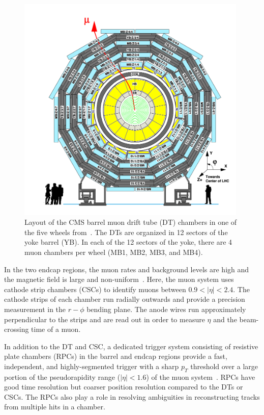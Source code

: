 \begin{figure}[ht]
    \centering
    \includegraphics[width=11cm]{figures/ch-2-cern-cms/phase-1-muon-barrel-DT-schematic.png}
    \caption[Layout of the CMS barrel muon drift tube (DT) chambers in one of the five wheels.]{Layout of the CMS barrel muon drift tube (DT) chambers in one of the five wheels from~\cite{CMS-2008-JINST-3-S08004}. The DTs are organized in 12 sectors of the yoke barrel (YB). In each of the 12 sectors of the yoke, there are 4 muon chambers per wheel (MB1, MB2, MB3, and MB4).}
    \label{fig:phase-1-muon-barrel-DT-schematic}
\end{figure}

In the two endcap regions, the muon rates and background levels are high and the magnetic field is large and non-uniform~\cite{CMS-2008-JINST-3-S08004}. Here, the muon system uses cathode strip chambers (CSCs) to identify muons between $0.9 < |\eta| < 2.4$. The cathode strips of each chamber run radially outwards and provide a precision measurement in the $r-\phi$ bending plane. The anode wires run approximately perpendicular to the strips and are read out in order to measure $\eta$ and the beam-crossing time of a muon. 

In addition to the DT and CSC, a dedicated trigger system consisting of resistive plate chambers (RPCs) in the barrel and endcap regions provide a fast, independent, and highly-segmented trigger with a sharp $p_T$ threshold over a large portion of the pseudorapidity range ($|\eta| < 1.6$) of the muon system~\cite{CMS-2008-JINST-3-S08004}. RPCs have good time resolution but coarser position resolution compared to the DTs or CSCs. The RPCs also play a role in resolving ambiguities in reconstructing tracks from multiple hits in a chamber. 

